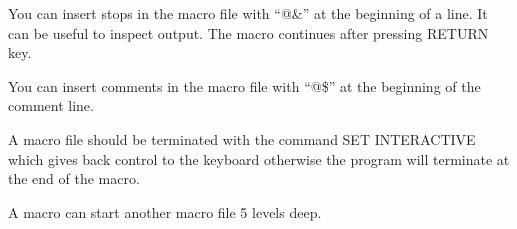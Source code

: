 \documentclass[12pt]{article}
\begin{document}
You can insert stops in the macro file with ``@\&'' at the beginning
of a line.  It can be useful to inspect output.  The macro continues
after pressing RETURN key.

You can insert comments in the macro file with ``@\$'' at the beginning
of the comment line.

A macro file should be terminated with the command SET INTERACTIVE
which gives back control to the keyboard otherwise the program will
terminate at the end of the macro.

A macro can start another macro file 5 levels deep.

%
%
%
%
\end{document}
